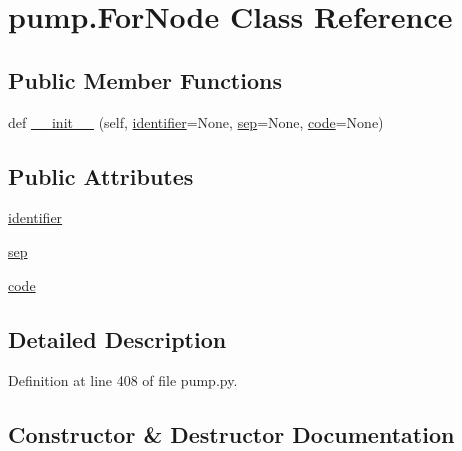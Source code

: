 \hypertarget{classpump_1_1_for_node}{}\section{pump.\+For\+Node Class Reference}
\label{classpump_1_1_for_node}
\subsection*{Public Member Functions}
\begin{DoxyCompactItemize}
\item 
def \hyperlink{classpump_1_1_for_node_a9cf60468cacdb06acce35074ab2a2b55}{\+\_\+\+\_\+init\+\_\+\+\_\+} (self, \hyperlink{classpump_1_1_for_node_a2444199e135e43696b3a006bd0d38982}{identifier}=None, \hyperlink{classpump_1_1_for_node_a06b493278b3c1ad53363a2bcc3b8efb3}{sep}=None, \hyperlink{classpump_1_1_for_node_afdb5f4f2a3bc772bbc6ea777dfde898e}{code}=None)
\end{DoxyCompactItemize}
\subsection*{Public Attributes}
\begin{DoxyCompactItemize}
\item 
\hyperlink{classpump_1_1_for_node_a2444199e135e43696b3a006bd0d38982}{identifier}
\item 
\hyperlink{classpump_1_1_for_node_a06b493278b3c1ad53363a2bcc3b8efb3}{sep}
\item 
\hyperlink{classpump_1_1_for_node_afdb5f4f2a3bc772bbc6ea777dfde898e}{code}
\end{DoxyCompactItemize}


\subsection{Detailed Description}


Definition at line 408 of file pump.\+py.



\subsection{Constructor \& Destructor Documentation}
